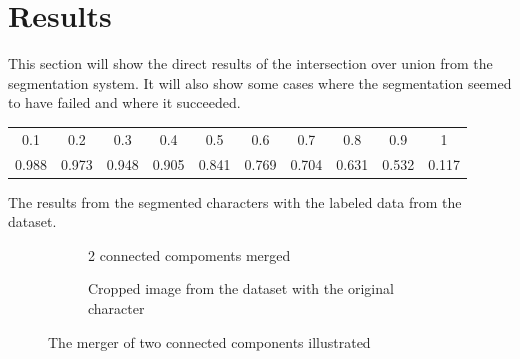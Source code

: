 \newpage
\section{Results} %
\label{sec:results}

This section will show the direct results of the intersection over union from the segmentation system. It will also show some cases where the segmentation seemed to have failed and where it succeeded.


\begin{minipage}{\linewidth}
\flushleft
{} \label{tab:results:iou} 
\begin{tabular}{ c c c c c c c c c c}
\hline
\hline
0.1		&	0.2		&	0.3		&	0.4		&	0.5		&	0.6		&	0.7		&	0.8		&	0.9		&	1		\\
0.988	&	0.973	&	0.948	&	0.905	&	0.841	&	0.769	&	0.704	&	0.631	&	0.532	&	0.117	\\
\hline
\end{tabular}\par
\bigskip
The results from the segmented characters with the labeled data from the dataset.
\end{minipage}



\begin{figure}[ht]
  \centering
  \begin{subfigure}{0.49\textwidth}
    \centering
    \caption{2 connected compoments merged}
    \label{fig:results:2cm:s}
  \end{subfigure}
  \begin{subfigure}{0.49\textwidth}
    \centering
    \caption{Cropped image from the dataset with the original character}
    \label{fig:results:2cm:o}
  \end{subfigure}
  \caption{The merger of two connected components illustrated}
  \label{fig:results:2cm}
\end{figure}



